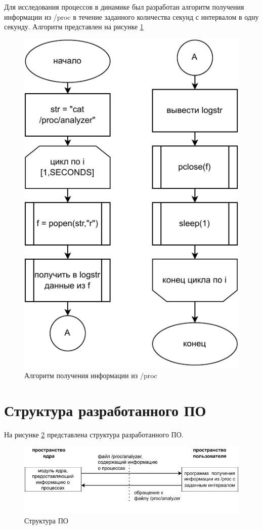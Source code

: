 Для исследования процессов в динамике был разработан алгоритм получения информации из /proc в течение заданного количества секунд с интервалом в одну секунду. Алгоритм представлен на рисунке \ref{img:osprogram.pdf}

\begin{figure}[H]
	\centering
	\includegraphics[scale=1]{img/os-program.pdf}
	\caption{Алгоритм получения информации из /proc}
	\label{img:osprogram.pdf}
\end{figure}

\section{Структура разработанного ПО}
На рисунке \ref{fig:structure} представлена структура разработанного ПО. 
\begin{figure}[H]
	\centering
	\includegraphics[scale=1]{img/os-structure.pdf}
	\caption{Структура ПО}
	\label{fig:structure}
\end{figure}
